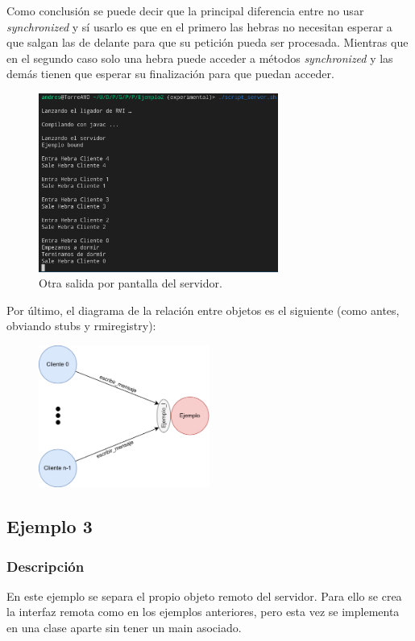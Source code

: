 \documentclass{article}
\begin{document}
Como conclusión se puede decir que la principal diferencia entre no usar \textit{synchronized} y sí usarlo es que en el primero las hebras no necesitan esperar a que salgan las de delante para que su petición pueda ser procesada. Mientras que en el segundo caso solo una hebra puede acceder a métodos \textit{synchronized} y las demás tienen que esperar su finalización para que puedan acceder.

\begin{figure}[H]
    \centering
    \includegraphics[width=0.7\textwidth]{imagenes/E2ServerSync2.png}
    \caption{Otra salida por pantalla del servidor.}
\end{figure}

Por último, el diagrama de la relación entre objetos es el siguiente (como antes, obviando stubs y rmiregistry):

\begin{figure}[H]
    \centering
    \includegraphics[width=0.5\textwidth]{imagenes/E2Diagrama.png}
\end{figure}

\subsection{Ejemplo 3}
\subsubsection{Descripción}
En este ejemplo se separa el propio objeto remoto del servidor. Para ello se crea la interfaz remota como en los ejemplos anteriores, pero esta vez se implementa en una clase aparte sin tener un main asociado.
\end{document}
